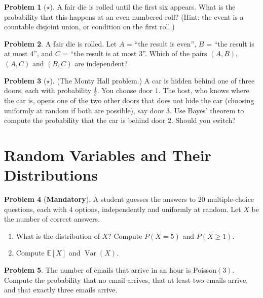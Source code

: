 \documentclass[11pt]{article}
\theoremstyle{definition}
\newtheorem{problem}{Problem}[section]
\newcommand{\mandatory}{\textcolor{red!70!black}{\textbf{Mandatory}}}
\newcommand{\E}{\mathbb{E}}
\DeclareMathOperator{\Var}{Var}
\begin{document}
\begin{problem}[$\star$]\label{pr:first-six}
    A fair die is rolled until the first six appears. What is the probability that this happens at an even-numbered roll? (Hint: the event is a countable disjoint union, or condition on the first roll.)
\end{problem}

\begin{problem}\label{pr:independent-events}
    A fair die is rolled. Let $A$ = ``the result is even'', $B$ = ``the result is at most $4$'', and $C$ = ``the result is at most $3$''. Which of the pairs $(A, B)$, $(A, C)$ and $(B, C)$ are independent?
\end{problem}

\begin{problem}[$\star$]\label{pr:monty-hall}
    (The Monty Hall problem.) A car is hidden behind one of three doors, each with probability $\frac{1}{3}$. You choose door $1$. The host, who knows where the car is, opens one of the two other doors that does not hide the car (choosing uniformly at random if both are possible), say door $3$. Use Bayes' theorem to compute the probability that the car is behind door $2$. Should you switch?
\end{problem}

\section{Random Variables and Their Distributions}

\begin{problem}[\mandatory]\label{pr:guessing}
    A student guesses the answers to $20$ multiple-choice questions, each with $4$ options, independently and uniformly at random. Let $X$ be the number of correct answers.
    \begin{enumerate}[label=(\alph*)]
        \item What is the distribution of $X$? Compute $P(X = 5)$ and $P(X \geq 1)$.
        \item Compute $\E[X]$ and $\Var(X)$.
    \end{enumerate}
\end{problem}

\begin{problem}\label{pr:poisson}
    The number of emails that arrive in an hour is Poisson$(3)$. Compute the probability that no email arrives, that at least two emails arrive, and that exactly three emails arrive.
\end{problem}
\end{document}
